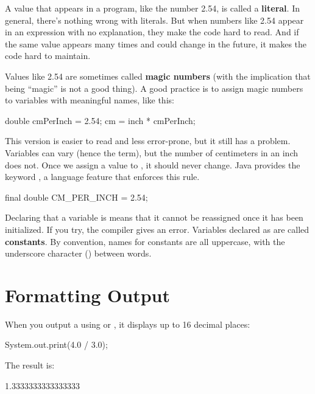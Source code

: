 
A value that appears in a program, like the number 2.54, is called a {\bf literal}.
In general, there's nothing wrong with literals.
But when numbers like 2.54 appear in an expression with no explanation, they make the code hard to read.
And if the same value appears many times and could change in the future, it makes the code hard to maintain.


Values like 2.54 are sometimes called {\bf magic numbers} (with the implication that being ``magic'' is not a good thing).
A good practice is to assign magic numbers to variables with meaningful names, like this:

\begin{code}
double cmPerInch = 2.54;
cm = inch * cmPerInch;
\end{code}

This version is easier to read and less error-prone, but it still has a problem.
Variables can vary (hence the term), but the number of centimeters in an inch does not.
Once we assign a value to , it should never change.
Java provides the keyword , a language feature that enforces this rule.

\begin{code}
final double CM_PER_INCH = 2.54;
\end{code}


Declaring that a variable is  means that it cannot be reassigned once it has been initialized.
If you try, the compiler gives an error.
Variables declared as  are called {\bf constants}.
By convention, names for constants are all uppercase, with the underscore character (\java{_}) between words.


\section{Formatting Output}
\label{printf}

When you output a  using  or , it displays up to 16 decimal places:

\begin{code}
System.out.print(4.0 / 3.0);
\end{code}

The result is:

\begin{stdout}
1.3333333333333333
\end{stdout}

